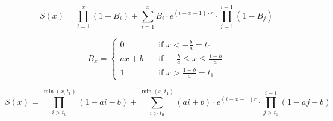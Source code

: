 \documentclass{article}
\begin{document}
\begin{equation}
S(x) = \prod_{i=1}^x (1-B_i) + \sum_{i=1}^x B_i \cdot e^{(i-x-1)\cdot r} \cdot \prod_{j=1}^{i-1} (1-B_j)
\end{equation}

\[ B_x = 
   \begin{cases}
      0 & \quad \text{if } x < -\frac{b}{a} = t_0\\
      ax + b & \quad \text{if } -\frac{b}{a} \leq x \leq \frac{1-b}{a}\\
      1 & \quad \text{if } x > \frac{1-b}{a} = t_1
   \end{cases}
\]

\begin{equation}
S(x) = \prod_{i>t_0}^{\min(x, t_1)} (1 - ai - b) + \sum_{i>t_0}^{\min(x,t_1)} (ai+b)\cdot e^{(i-x-1)r} \cdot \prod_{j>t_0}^{i-1}(1-aj-b)
\end{equation}
\end{document}

